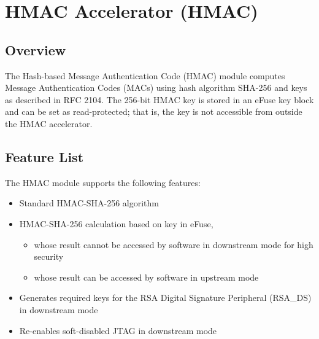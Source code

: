 \documentclass[main\_\_EN.tex]{subfiles}
\begin{document}
\setenglishformatting

\ifglobal
\else
    \clearpage
    \listoftodos
    \listofdonetodos
    \tableofcontents
\fi



\hypertarget{hmac}{}
\chapter{HMAC Accelerator (HMAC)}
\label{mod:hmac}

\section{Overview}

The Hash-based Message Authentication Code (HMAC) module computes Message Authentication Codes (MACs) using hash algorithm SHA-256 and keys as described in RFC 2104. The 256-bit HMAC key is stored in an eFuse key block and can be set as read-protected; that is, the key is not accessible from outside the HMAC accelerator.

\section{Feature List}

The HMAC module supports the following features:

\begin{itemize}
    \item Standard HMAC-SHA-256 algorithm
    \item HMAC-SHA-256 calculation based on key in eFuse,
    \begin{itemize}
    \item whose result cannot be accessed by software in downstream mode for high security
    \item whose result can be accessed by software in upstream mode
    \end{itemize}
    \item Generates required keys for the RSA Digital Signature Peripheral (RSA\_DS) in downstream mode
    \item Re-enables soft-disabled JTAG in downstream mode
\end{itemize}
\end{document}
